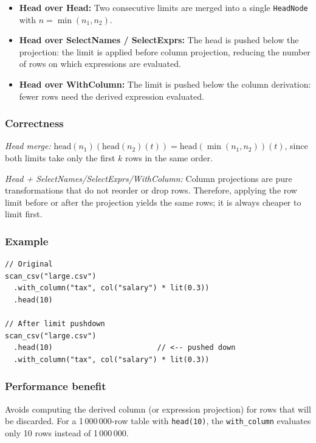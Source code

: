 \documentclass[12pt,a4paper]{article}
\begin{document}
\begin{itemize}[leftmargin=1.5em]
  \item \textbf{Head over Head:} Two consecutive limits are merged into
        a single \texttt{HeadNode} with $n = \min(n_1, n_2)$.

  \item \textbf{Head over SelectNames / SelectExprs:} The head is pushed
        below the projection: the limit is applied before column projection,
        reducing the number of rows on which expressions are evaluated.

  \item \textbf{Head over WithColumn:} The limit is pushed below the
        column derivation: fewer rows need the derived expression evaluated.
\end{itemize}

\subsubsection*{Correctness}

\emph{Head merge:} $\text{head}(n_1)(\text{head}(n_2)(t)) =
\text{head}(\min(n_1,n_2))(t)$, since both limits take only the first $k$
rows in the same order.

\emph{Head + SelectNames/SelectExprs/WithColumn:} Column projections are
pure transformations that do not reorder or drop rows.  Therefore, applying
the row limit before or after the projection yields the same rows; it is
always cheaper to limit first.

\subsubsection*{Example}

\begin{lstlisting}
// Original
scan_csv("large.csv")
  .with_column("tax", col("salary") * lit(0.3))
  .head(10)

// After limit pushdown
scan_csv("large.csv")
  .head(10)                        // <-- pushed down
  .with_column("tax", col("salary") * lit(0.3))
\end{lstlisting}

\subsubsection*{Performance benefit}

Avoids computing the derived column (or expression projection) for rows
that will be discarded.  For a 1\,000\,000-row table with
\texttt{head(10)}, the \texttt{with\_column} evaluates only 10 rows
instead of 1\,000\,000.
\end{document}
